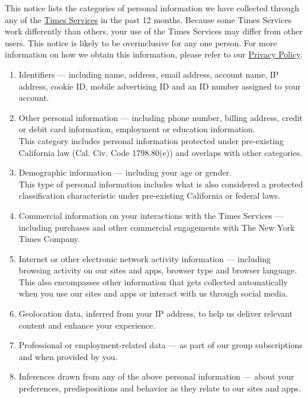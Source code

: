 This notice lists the categories of personal information we have
collected through any of the
\href{http://www.nytimes.com/privacy/privacy-policy}{Times Services} in
the past 12 months. Because some Times Services work differently than
others, your use of the Times Services may differ from other users. This
notice is likely to be overinclusive for any one person. For more
information on how we obtain this information, please refer to our
\href{http://www.nytimes.com/privacy/privacy-policy\#what-information-do-we-gather-about-you}{Privacy
Policy}.

\begin{enumerate}
\def\labelenumi{\arabic{enumi}.}
\item
  Identifiers --- including name, address, email address, account name,
  IP address, cookie ID, mobile advertising ID and an ID number assigned
  to your account.
\item
  Other personal information --- including phone number, billing
  address, credit or debit card information, employment or education
  information.\\
  This category includes personal information protected under
  pre-existing California law (Cal. Civ. Code 1798.80(e)) and overlaps
  with other categories.
\item
  Demographic information --- including your age or gender.\\
  This type of personal information includes what is also considered a
  protected classification characteristic under pre-existing California
  or federal laws.
\item
  Commercial information on your interactions with the Times Services
  --- including purchases and other commercial engagements with The New
  York Times Company.
\item
  Internet or other electronic network activity information ---
  including browsing activity on our sites and apps, browser type and
  browser language. This also encompasses other information that gets
  collected automatically when you use our sites and apps or interact
  with us through social media.
\item
  Geolocation data, inferred from your IP address, to help us deliver
  relevant content and enhance your experience.
\item
  Professional or employment-related data --- as part of our group
  subscriptions and when provided by you.
\item
  Inferences drawn from any of the above personal information --- about
  your preferences, predispositions and behavior as they relate to our
  sites and apps.
\end{enumerate}

